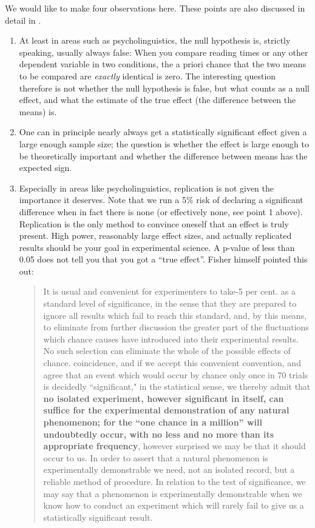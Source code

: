 \documentclass[12pt]{book}\usepackage[]{graphicx}\usepackage[]{color}
\begin{document}
We would like to make four observations here. These points are also discussed in detail in \cite{VasishthMertzenJaegerGelman2018}.

\begin{enumerate}
	\item
	At least in areas such as psycholinguistics, the null
        hypothesis is, strictly speaking, usually always false: When
        you compare reading times or any other dependent variable in
        two conditions, the a priori chance that the two means to be
        compared are \emph{exactly} identical is zero. The interesting
        question therefore is not whether the null hypothesis is
        false, but what counts as a null effect, and what the estimate of the true effect (the difference between the means) is. 
	\item
	One can in principle nearly always get a statistically
        significant effect given a large enough sample size; the
        question is whether the effect is large enough to be
        theoretically important and whether the difference between
        means has the expected sign. 
      \item Especially in areas like psycholinguistics, replication is
        not given the importance it deserves.  Note that we run a 5\%
        risk of declaring a significant difference when in fact there
        is none (or effectively none, see point 1 above). Replication is the only method to convince
        oneself that an effect is truly present. High power, reasonably large effect sizes, and
        actually replicated results should be your goal in
        experimental science.
A p-value of less than 0.05 does not tell you that you got a ``true effect''. Fisher himself pointed this out:

\begin{quote}
It is usual and convenient for experimenters to take-5 per cent. as a standard level of significance, in the sense that they are prepared to ignore all results which fail to reach this standard, and, by this means, to eliminate from further discussion the greater part of the fluctuations which chance causes have introduced into their experimental results. No such selection can eliminate the whole of the possible effects of chance. coincidence, and if we accept this convenient convention, and agree that an event which would occur by chance only once in 70 trials is decidedly ``significant," in the statistical sense, we thereby admit that \textbf{no isolated experiment, however significant in itself, can suffice for the experimental demonstration of any natural phenomenon; for the ``one chance in a million'' will undoubtedly occur, with no less and no more than its appropriate frequency}, however surprised we may be that it should occur to us. In order to assert that a natural phenomenon is experimentally demonstrable we need, not an isolated record, but a reliable method of procedure. In relation to the test of significance, we may say that a phenomenon is experimentally demonstrable when we know how to conduct an experiment which will rarely fail to give us a statistically significant result.
\end{quote}


\end{enumerate}
\end{document}
